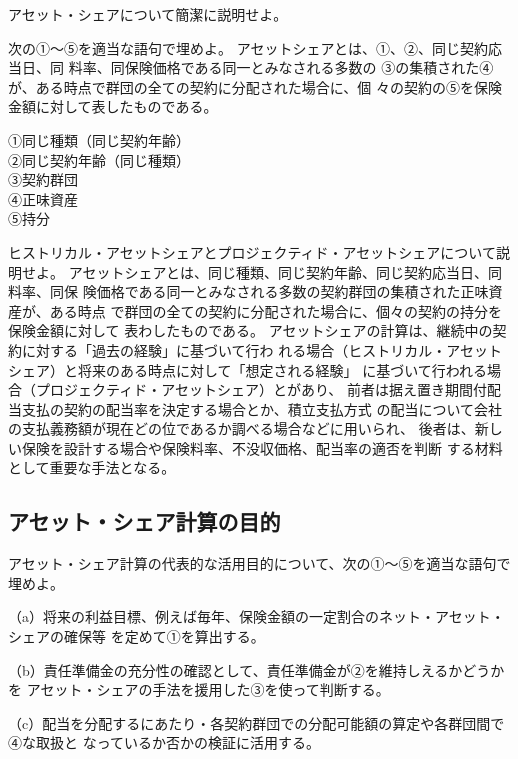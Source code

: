 \documentclass[report,gutter=10mm,fore-edge=10mm,uplatex,dvipdfmx]{jlreq}
\begin{document}
アセット・シェアについて簡潔に説明せよ。

次の①〜⑤を適当な語句で埋めよ。
アセットシェアとは、①、②、同じ契約応当日、同
料率、同保険価格である同一とみなされる多数の
③の集積された④が、ある時点で群団の全ての契約に分配された場合に、個
々の契約の⑤を保険金額に対して表したものである。

\answer{}
\noindent
①同じ種類（同じ契約年齢）\\
②同じ契約年齢（同じ種類）\\
③契約群団\\
④正味資産\\
⑤持分

ヒストリカル・アセットシェアとプロジェクティド・アセットシェアについて説明せよ。
\answer{}
アセットシェアとは、同じ種類、同じ契約年齢、同じ契約応当日、同料率、同保
険価格である同一とみなされる多数の契約群団の集積された正味資産が、ある時点
で群団の全ての契約に分配された場合に、個々の契約の持分を保険金額に対して
表わしたものである。
アセットシェアの計算は、継続中の契約に対する「過去の経験」に基づいて行わ
れる場合（ヒストリカル・アセットシェア）と将来のある時点に対して「想定される経験」
に基づいて行われる場合（プロジェクティド・アセットシェア）とがあり、
前者は据え置き期間付配当支払の契約の配当率を決定する場合とか、積立支払方式
の配当について会社の支払義務額が現在どの位であるか調べる場合などに用いられ、
後者は、新しい保険を設計する場合や保険料率、不没収価格、配当率の適否を判断
する材料として重要な手法となる。

\subsection{アセット・シェア計算の目的}

アセット・シェア計算の代表的な活用目的について、次の①～⑤を適当な語句で埋めよ。

（a）将来の利益目標、例えば毎年、保険金額の一定割合のネット・アセット・シェアの確保等
を定めて①を算出する。

（b）責任準備金の充分性の確認として、責任準備金が②を維持しえるかどうかを
アセット・シェアの手法を援用した③を使って判断する。

（c）配当を分配するにあたり・各契約群団での分配可能額の算定や各群団間で④な取扱と
なっているか否かの検証に活用する。
\end{document}
